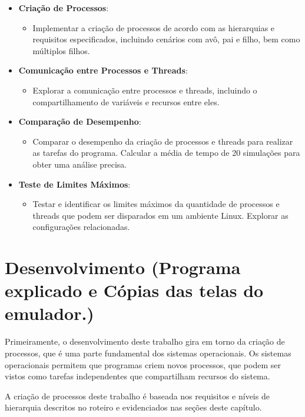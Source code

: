 \documentclass[
	12pt,				%
	openright,			%
	oneside,			%
	a4paper,			%
	chapter=TITLE,		%
	english,			%
	french,				%
	spanish,			%
	brazil				%
	]{abntex2}
\theoremstyle{definition}
\begin{document}
\begin{itemize}
    \item \textbf{Criação de Processos}:
    \begin{itemize}
        \item Implementar a criação de processos de acordo com as hierarquias e requisitos especificados, incluindo cenários com avô, pai e filho, bem como múltiplos filhos.
    \end{itemize}

    \item \textbf{Comunicação entre Processos e Threads}:
    \begin{itemize}
        \item Explorar a comunicação entre processos e threads, incluindo o compartilhamento de variáveis e recursos entre eles.
    \end{itemize}

    \item \textbf{Comparação de Desempenho}:
    \begin{itemize}
        \item Comparar o desempenho da criação de processos e threads para realizar as tarefas do programa. Calcular a média de tempo de 20 simulações para obter uma análise precisa.
    \end{itemize}

    \item \textbf{Teste de Limites Máximos}:
    \begin{itemize}
        \item Testar e identificar os limites máximos da quantidade de processos e threads que podem ser disparados em um ambiente Linux. Explorar as configurações relacionadas.
    \end{itemize}
\end{itemize}

  

\chapter{Desenvolvimento (Programa explicado e Cópias das telas do emulador.)}

Primeiramente, o desenvolvimento deste trabalho gira em torno da criação
de processos, que é uma parte fundamental dos sistemas operacionais. 
Os sistemas operacionais permitem que programas criem novos processos, que 
podem ser vistos como tarefas independentes que compartilham recursos do sistema. 

A criação de processos deste trabalho é baseada nos requisitos e níveis de hierarquia descritos 
no roteiro e evidenciados nas seções deste capítulo.
\end{document}
